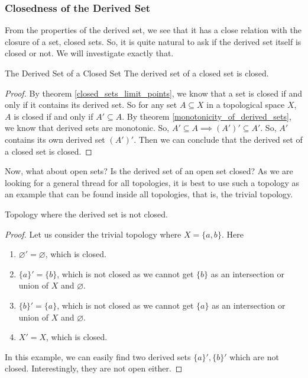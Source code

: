 \subsubsection{Closedness of the Derived Set}
From the properties of the derived set, we see that it has a close relation with the closure of a set, closed sets. So, it is quite natural to ask if the derived set itself is closed or not. We will investigate exactly that.
\begin{Theorem}{The Derived Set of a Closed Set}\label{derived_set_of_closed_set_is_closed}
    The derived set of a closed set is closed.
\end{Theorem}
\begin{proof}
    By theorem \eqref{closed_sets_limit_points}, we know that a set is closed if and only if it contains its derived set. So for any set $A\subseteq X$ in a topological space $X$, $A$ is closed if and only if $A'\subseteq A$. By theorem \eqref{monotonicity_of_derived_sets}, we know that derived sets are monotonic. So, $A'\subseteq A\implies (A')'\subseteq A'$. So, $A'$ contains its own derived set $(A')'$. Then we can conclude that the derived set of a closed set is closed.
\end{proof}
\noindent Now, what about open sets? Is the derived set of an open set closed? As we are looking for a general thread for all topologies, it is best to use such a topology as an example that can be found inside all topologies, that is, the trivial topology.
\begin{Example}\label{derived_set_being_not_closed}
    Topology where the derived set is not closed.
\end{Example}
\begin{proof}
    Let us consider the trivial topology where $X=\{a,b\}$. Here
    \begin{enumerate}
        \item $\varnothing'=\varnothing$, which is closed.
        \item $\{a\}'=\{b\}$, which is not closed as we cannot get $\{b\}$ as an intersection or union of $X$ and $\varnothing$.
        \item $\{b\}'=\{a\}$, which is not closed as we cannot get $\{a\}$ as an intersection or union of $X$ and $\varnothing$.
        \item $X'=X$, which is closed.
    \end{enumerate}
    In this example, we can easily find two derived sets $\{a\}',\{b\}'$ which are not closed. Interestingly, they are not open either.
\end{proof}
